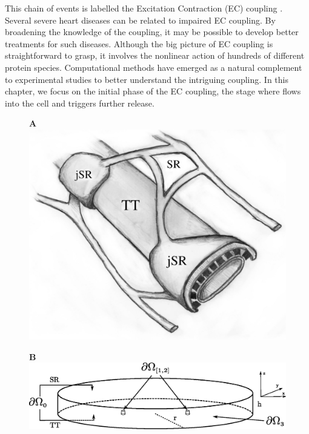 This chain of events is labelled the Excitation Contraction (EC) coupling \cite{Bers2001}. Several severe heart diseases can be related to impaired EC coupling. By broadening the knowledge of the coupling, it may be possible to develop better treatments for such diseases. Although the big picture of EC coupling is straightforward to grasp, it involves the nonlinear action of hundreds of different protein species. Computational methods have emerged as a natural complement to experimental studies to better understand the intriguing coupling. In this chapter, we focus on the initial phase of the EC coupling, the stage where \Ca flows into the cell and triggers further \Ca release.\par

\newcommand{\figheight}{3.5cm}
\begin{figure}[t]
  \centering
  \begin{minipage}[t]{0.35\linewidth}
    \large \textbf{A}\\
    \includegraphics[width=\linewidth]{chapters/hake/eps/SR_TT}
  \end{minipage}
  \begin{minipage}[t]{0.64\linewidth}
    \large \textbf{B}\\
    \includegraphics[width=\linewidth]{chapters/hake/eps/disk}

\end{minipage}
\end{figure}
